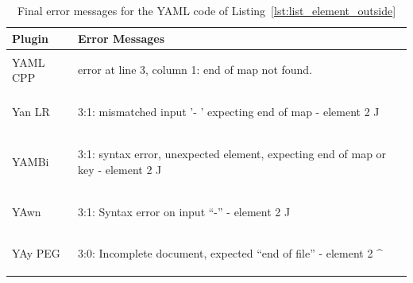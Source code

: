 \begin{table}[H]
  \caption{Final error messages for the YAML code of Listing~\ref{lst:list_element_outside}}
  \label{tab:error_messages_final_list_element_outside}

  \centering
  \begin{tabular}{lp{}}
    \toprule
    Plugin & Error Messages\\
    \midrule

    \vspace{0cm}
    YAML CPP &
    \vspace{-0.36cm}
    \begin{textcode}
      error at line 3, column 1: end of map not found.
    \end{textcode}
    \\

    \vspace{0cm}
    Yan LR &
    \vspace{-0.36cm}
    \begin{textcode}
      3:1: mismatched input '- ' expecting end of map
           - element 2
           ^^
    \end{textcode}
    \\

    \vspace{0cm}
    YAMBi &
    \vspace{-0.36cm}
    \begin{textcode}
      3:1: syntax error, unexpected element,
           expecting end of map or key
           - element 2
           ^^
    \end{textcode}
    \\

    \vspace{0cm}
    YAwn &
    \vspace{-0.36cm}
    \begin{textcode}
      3:1: Syntax error on input “-”
           - element 2
           ^^
    \end{textcode}
    \\

    \vspace{0cm}
    YAy PEG &
    \vspace{-0.36cm}
    \begin{textcode}
      3:0: Incomplete document, expected “end of file”
           - element 2
           ^
    \end{textcode}
    \\

    \bottomrule

  \end{tabular}
\end{table}


